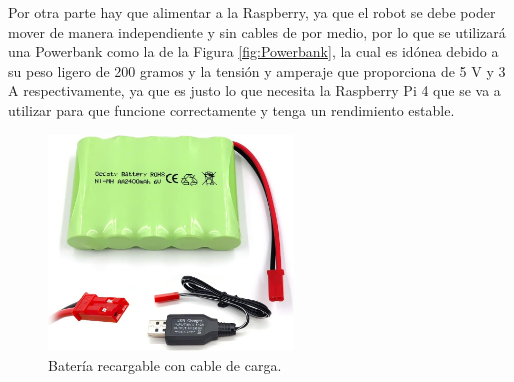 Por otra parte hay que alimentar a la Raspberry, ya que el robot se debe poder mover de manera independiente y sin cables de por medio, por lo que se utilizará una Powerbank como la de la Figura \ref{fig:Powerbank}, la cual es idónea debido a su peso ligero de 200 gramos y la tensión y amperaje que proporciona de 5 V y 3 A respectivamente, ya que es justo lo que necesita la Raspberry Pi 4 que se va a utilizar para que funcione correctamente y tenga un rendimiento estable.

\begin{figure}[H]
  \begin{minipage}{0.48\textwidth}
    \centering
    \includegraphics[width=6.5cm]{figs/bateria.jpg}
    \caption{Batería recargable con cable de carga.}
    \label{fig:bateria}
  \end{minipage}
  \hfill
  \begin{minipage}{0.48\textwidth}
    \centering

\end{minipage}
\end{figure}
